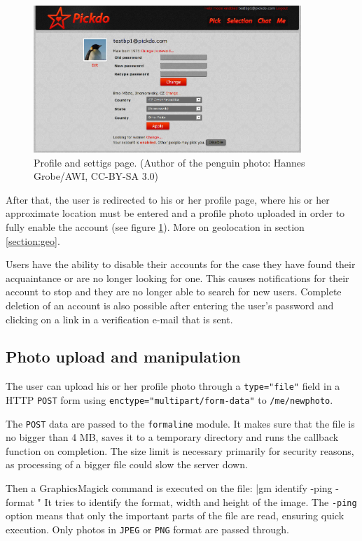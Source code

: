 \documentclass[12pt,oneside]{fithesis}
\begin{document}
		\begin{figure}[h]
	  \centering
	    \includegraphics[width=0.9\textwidth]{screen-profile.png}
		  \caption{Profile and settigs page. (Author of the penguin photo: Hannes Grobe/AWI, CC-BY-SA 3.0)}
		  \label{fig:screen-profile}
	  \end{figure}	  
	  
	  After that, the user is redirected to his or her profile page, where his or her approximate location must be entered and a profile photo uploaded in order to fully enable the account (see figure \ref{fig:screen-profile}). More on geolocation in section \ref{section:geo}.
	  
	  Users have the ability to disable their accounts for the case they have found their acquaintance or are no longer looking for one. This causes notifications for their account to stop and they are no longer able to search for new users. Complete deletion of an account is also possible after entering the user's password and clicking on a link in a verification e-mail that is sent.
	\subsection{Photo upload and manipulation}
		The user can upload his or her profile photo through a \texttt{type="file"} field in a HTTP \texttt{POST} form using \texttt{enctype="multipart/form-data"} to \texttt{/me/newphoto}.
		
		The \texttt{POST} data are passed to the \texttt{formaline} module. It makes sure that the file is no bigger than 4 MB, saves it to a temporary directory and runs the callback function on completion. The size limit is necessary primarily for security reasons, as processing of a bigger file could slow the server down.
		
		Then a GraphicsMagick command is executed on the file:
		|gm identify -ping -format "%
		It tries to identify the format, width and height of the image. The \texttt{-ping} option means that only the important parts of the file are read, ensuring quick execution. Only photos in \texttt{JPEG} or \texttt{PNG} format are passed through.
		
\end{document}
